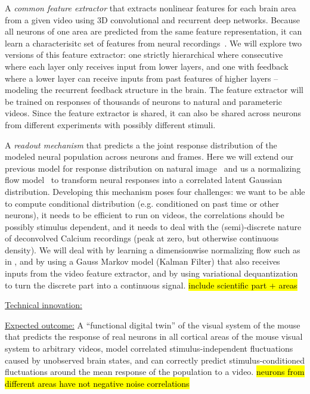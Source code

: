 \documentclass[COG,11pt]{ercgrant}
\begin{document}
A \textit{common feature extractor} that extracts nonlinear features for each brain area from a given video using 3D convolutional and recurrent deep networks. Because all neurons of one area are predicted from the same feature representation, it can learn a characterisitc set of features from neural recordings~\parencite{Lurz2020-ua}. We will explore two versions of this feature extractor: one strictly hierarchical where consecutive where each layer only receives input from lower layers, and one with feedback where a lower layer can receive inputs from past features of higher layers -- modeling the recurrent feedback structure in the brain. The feature extractor will be trained on responses of thousands of neurons to natural and parameteric videos. Since the feature extractor is shared, it can also be shared across neurons from different experiments with possibly different stimuli. 
    
A \textit{readout mechanism} that predicts a the joint response distribution of the modeled neural population across neurons and frames. Here we will extend our previous model for response distribution on natural image~\parencite{Bashiri2021-or} and us a normalizing flow model~\parencite{Rezende2015-mx} to transform neural responses into a correlated latent Gaussian distribution. Developing this mechanism poses four challenges:  we want to be able to compute conditional distribution (e.g. conditioned on past time or other neurons),  it needs to be efficient to run on videos,  the correlations should be possibly stimulus dependent, and  it needs to deal with the (semi)-discrete nature of deconvolved Calcium recordings (peak at zero, but otherwise continuous density). We will deal with  by learning a dimensionwise normalizing flow such as in \cite{Bashiri2021-or},  and  by using a Gauss Markov model (Kalman Filter) that also receives inputs from the video feature extractor, and  by using variational dequantization~\parencite{Hoogeboom2021-zs} to turn the discrete part into a continuous signal.  \hl{include scientific part + areas}

\underline{Technical innovation:}


\underline{Expected outcome:} A ``functional digital twin'' of the visual system of the mouse that  predicts the response of real neurons in all cortical areas of the mouse visual system to arbitrary videos,  model correlated stimulus-independent fluctuations caused by unobserved brain states, and  can correctly predict stimulus-conditioned fluctuations around the mean response of the population to a video. 
\hl{neurons from different areas have not negative noise correlations}
\end{document}
